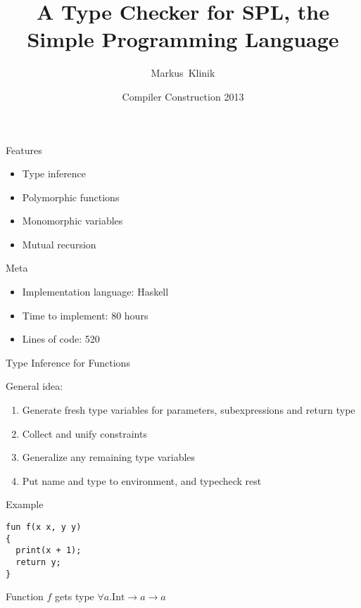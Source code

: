 \documentclass{beamer}
\title
{A Type Checker for SPL, the Simple Programming Language}
\author
{Markus~Klinik}
\institute[Radboud University Nijmegen]
{
  Radboud University Nijmegen
}
\date
{Compiler Construction 2013}
\newcommand{\arr}{\rightarrow}
\begin{document}
\begin{frame}
  \titlepage
\end{frame}

\begin{frame}{Features}

  \begin{itemize}
    \item Type inference
    \item Polymorphic functions
    \item Monomorphic variables
    \item Mutual recursion
  \end{itemize}

\end{frame}

\begin{frame}{Meta}

  \begin{itemize}
    \item Implementation language: Haskell
    \item Time to implement: 80 hours
    \item Lines of code: 520
  \end{itemize}

\end{frame}


\begin{frame}{Type Inference for Functions}

General idea:

  \begin{enumerate}
    \item Generate fresh type variables for parameters, subexpressions
    and return type
    \item Collect and unify constraints
    \item Generalize any remaining type variables
    \item Put name and type to environment, and typecheck rest
  \end{enumerate}

\end{frame}


\begin{frame}[fragile]{Example}

\begin{verbatim}
fun f(x x, y y)
{
  print(x + 1);
  return y;
}
\end{verbatim}

Function $f$ gets type $\forall a . \text{Int} \arr a \arr a$

\end{frame}
\end{document}
